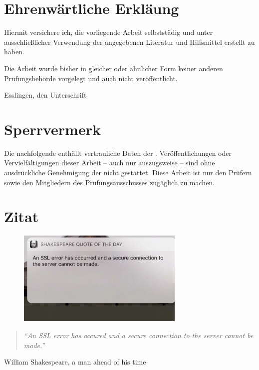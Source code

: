 \chapter*{Ehrenwärtliche Erkläung}

Hiermit versichere ich, die vorliegende Arbeit selbststädig und unter ausschließlicher Verwendung der angegebenen Literatur und Hilfsmittel erstellt zu haben.

Die Arbeit wurde bisher in gleicher oder ähnlicher Form keiner anderen Prüfungsbehörde vorgelegt und auch nicht veröffentlicht.

\hrulefill

Esslingen, den \workDate \hspace*{\fill} Unterschrift


\newpage
%
\chapter*{Sperrvermerk} %

Die nachfolgende \workType enthällt vertrauliche Daten der \workComany.
Veröffentlichungen oder Vervielfältigungen dieser Arbeit -- auch nur auszugsweise -- sind ohne ausdrückliche Genehmigung der \workComany nicht gestattet.
Diese Arbeit ist nur den Prüfern sowie den Mitgliedern des Prüfungsausschusses zugäglich zu machen.
\newpage
%
\chapter*{Zitat} %
\begin{center}
\begin{figure}[ht]
  \centering
  \includegraphics[width=8cm]{assets/shakespeare.jpeg}
\end{figure}

\begin{minipage}{12cm}
\begin{quotation}
\textit{\enquote{An SSL error has occured and a secure connection to the server cannot be made.}}
\end{quotation}
\hfill \textsf William Shakespeare, a man ahead of his time
\end{minipage}
\end{center}
\newpage{}
%
